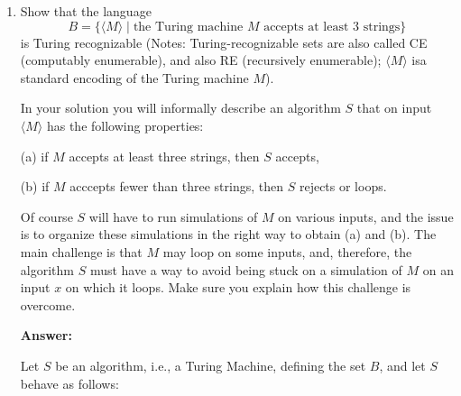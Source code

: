 \documentclass[11pt]{article}
\begin{document}
\vline

\begin{enumerate}[label=\textbf{Exercise \arabic{*}}]

  \item \label{e3}
        Show that the language
        \[
          B = \{\langle M \rangle \mid \mbox{the Turing machine $M$ accepts at least $3$ strings}\}
        \]  is
        Turing recognizable (Notes: Turing-recognizable sets are also called CE (computably enumerable), and also RE (recursively enumerable);  $\langle M \rangle$ isa standard encoding of the Turing machine $M$).

        \medskip

        In your solution you will informally describe an algorithm $S$ that on input $\langle M \rangle$  has the following properties:

        (a)	if $M$ accepts at least three strings, then $S$ accepts,

        (b)	if $M$ acccepts fewer than three strings, then $S$ rejects or loops.

        Of course $S$ will have to run  simulations of $M$ on various inputs,  and the issue is to organize these simulations in the right way to obtain (a) and (b). The main challenge is that $M$ may loop on some inputs, and, therefore, the algorithm $S$ must have a way to avoid being stuck on a simulation of $M$ on an input $x$ on which it loops. Make sure you explain how this challenge is overcome.
        \medskip

        \textbf{Answer:}

        Let $S$ be an algorithm, i.e., a Turing Machine, defining the set $B$, and let $S$ behave as follows:


\end{enumerate}
\end{document}
